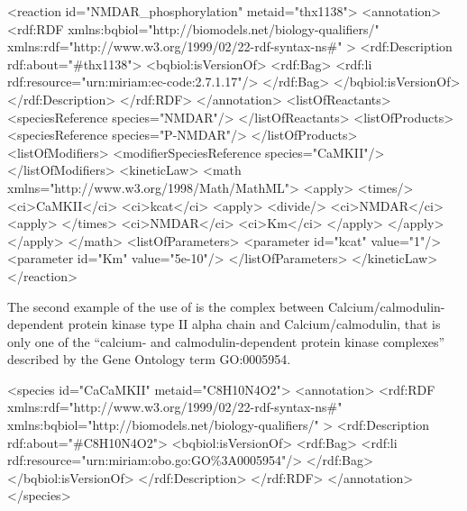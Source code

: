 \begin{blockChanged}
\begin{example}
<reaction id="NMDAR_phosphorylation" metaid="thx1138">
  <annotation>
    <rdf:RDF
      xmlns:bqbiol="http://biomodels.net/biology-qualifiers/"
      xmlns:rdf="http://www.w3.org/1999/02/22-rdf-syntax-ns\#"
    >
      <rdf:Description rdf:about="#thx1138">
        <bqbiol:isVersionOf>
          <rdf:Bag>
            <rdf:li rdf:resource="urn:miriam:ec-code:2.7.1.17"/>
          </rdf:Bag>
        </bqbiol:isVersionOf>
      </rdf:Description>
    </rdf:RDF>
  </annotation>
  <listOfReactants>
    <speciesReference species="NMDAR"/>
  </listOfReactants>
  <listOfProducts>
    <speciesReference species="P-NMDAR"/>
  </listOfProducts>
  <listOfModifiers>
    <modifierSpeciesReference species="CaMKII"/>
  </listOfModifiers>
  <kineticLaw>
    <math xmlns="http://www.w3.org/1998/Math/MathML">
      <apply>
        <times/>
        <ci>CaMKII</ci>
        <ci>kcat</ci>
        <apply>
          <divide/>
          <ci>NMDAR</ci>
          <apply>
            </times>
            <ci>NMDAR</ci>
            <ci>Km</ci>
          </apply>
        </apply>
      </apply>
    </math>
    <listOfParameters>
      <parameter id="kcat" value="1"/>
      <parameter id="Km" value="5e-10"/>
    </listOfParameters>
  </kineticLaw>
</reaction>
\end{example}
\end{blockChanged}

The second example of the use of  is the
complex between Calcium/calmodulin-dependent protein kinase type
II alpha chain and Calcium/calmodulin, that is only one of the
``calcium- and calmodulin-dependent protein kinase complexes''
described by the Gene Ontology term GO:0005954.

\begin{blockChanged}
\begin{example}
<species id="CaCaMKII" metaid="C8H10N4O2">
  <annotation>
    <rdf:RDF
      xmlns:rdf="http://www.w3.org/1999/02/22-rdf-syntax-ns\#"
      xmlns:bqbiol="http://biomodels.net/biology-qualifiers/"
    >
      <rdf:Description rdf:about="\#C8H10N4O2">
        <bqbiol:isVersionOf>
          <rdf:Bag>
            <rdf:li rdf:resource="urn:miriam:obo.go:GO\%3A0005954"/>
          </rdf:Bag>
        </bqbiol:isVersionOf>
      </rdf:Description>
    </rdf:RDF>
  </annotation>
</species>
\end{example}
\end{blockChanged}

